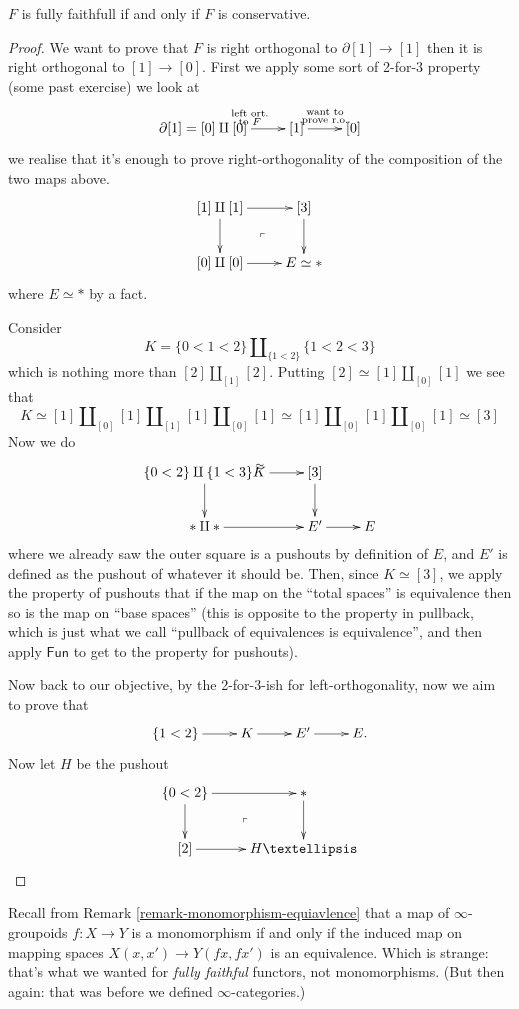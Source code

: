 \begin{theorem}
\label{theorem-fully-faithful-implies-conservative}
$F$ is fully faithfull if and only if
$F$ is conservative.
\end{theorem}

\begin{proof}
We want to prove that $F$ 
is right orthogonal to $\partial[1]\to [1]$
then it is right orthogonal to $[1]\to [0]$.
First we apply some sort of 2-for-3
property (some past exercise)
we look at
$$
\xymatrix{
\partial[1]=[0]\amalg[0]\ar[r]^{\substack{\text{left ort.} \\ \text{to $F$}}}
& [1]\ar[r]^{\substack{\text{want to} \\ \text{prove r.o.}}}
&[0]
}
$$
we realise that it's enough
to prove right-orthogonality of the
composition of the two maps above.
$$
\xymatrix{
[1]\amalg[1]\ar[r]\ar[d]\ar@{}[dr]|-{\ulcorner}&[3]\ar[d]\\
[0]\amalg[0]\ar[r]&E\simeq \ast
}
$$
where $E \simeq *$ by a fact.

Consider
$$
K=\{0<1<2\}\amalg_{\{1<2\}}\{1<2<3\}
$$
which is nothing more than $[2]\amalg_{[1]}[2]$.
Putting $[2]\simeq[1]\amalg_{[0]}[1]$ 
we see that
$$
K\simeq[1]\amalg_{[0]}[1]\amalg_{[1]}[1]\amalg_{[0]}[1]
\simeq[1]\amalg_{[0]}[1]\amalg_{[0]}[1]\simeq[3]
$$
Now we do
$$
\xymatrix{
\{0<2\}\amalg\{1<3\}K\ar[r]^{\simeq}\ar[d]&[3]\ar[d]\\
\ast \amalg \ast\ar[r]&E' \ar[r]&E
}
$$
where we already saw the outer square is
a pushouts by definition of $E$,
and $E'$ is defined as the pushout of
whatever it should be.
Then, since $K \simeq [3]$,
we apply the property of pushouts
that if the map on the ``total spaces''
is equivalence then so is the
map on ``base spaces''
(this is opposite to the property in pullback,
which is just what we call
``pullback of equivalences is equivalence'',
and then apply $\mathsf{Fun}$ 
to get to the property for pushouts).

Now back to our objective,
by the 2-for-3-ish for left-orthogonality,
now we aim to prove that
$$
\xymatrix{
\{1<2\}\ar[r]& K\ar[r]&E'\ar[r]&E.
}
$$
Now let $H$ be the pushout
$$
\xymatrix{
\{0<2\} \ar[r]\ar[d]\ar@{}[dr]|-{\ulcorner}& \ast \ar[d]\\
[2] \ar[r]& H…
}
$$
\end{proof}

Recall from Remark \ref{remark-monomorphism-equiavlence}
that a map of $\infty$-groupoids $f:X \to Y$
is a monomorphism if and only if 
the induced map on mapping spaces
$X(x,x') \to Y(fx,fx')$ is an equivalence.
Which is strange: that's what we wanted for
{\it fully faithful} functors, not monomorphisms.
(But then again: that was before we defined
$\infty$-categories.)

